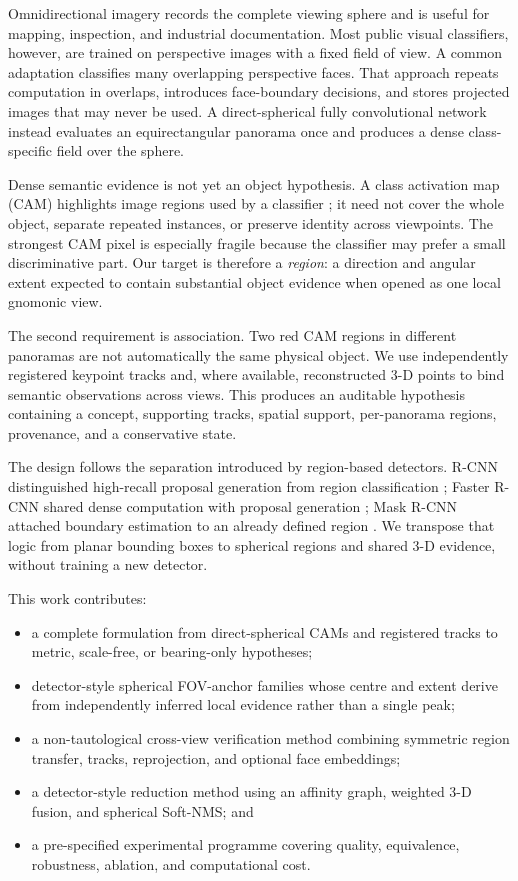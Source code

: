 \documentclass[a4paper,9pt]{extarticle}
\begin{document}
Omnidirectional imagery records the complete viewing sphere and is useful for mapping, inspection, and industrial documentation. Most public visual classifiers, however, are trained on perspective images with a fixed field of view. A common adaptation classifies many overlapping perspective faces. That approach repeats computation in overlaps, introduces face-boundary decisions, and stores projected images that may never be used. A direct-spherical fully convolutional network instead evaluates an equirectangular panorama once and produces a dense class-specific field over the sphere.

Dense semantic evidence is not yet an object hypothesis. A class activation map (CAM) highlights image regions used by a classifier \citep{zhou2016cam}; it need not cover the whole object, separate repeated instances, or preserve identity across viewpoints. The strongest CAM pixel is especially fragile because the classifier may prefer a small discriminative part. Our target is therefore a \emph{region}: a direction and angular extent expected to contain substantial object evidence when opened as one local gnomonic view.

The second requirement is association. Two red CAM regions in different panoramas are not automatically the same physical object. We use independently registered keypoint tracks and, where available, reconstructed 3-D points to bind semantic observations across views. This produces an auditable hypothesis containing a concept, supporting tracks, spatial support, per-panorama regions, provenance, and a conservative state.

The design follows the separation introduced by region-based detectors. R-CNN distinguished high-recall proposal generation from region classification \citep{girshick2014rcnn}; Faster R-CNN shared dense computation with proposal generation \citep{ren2015faster}; Mask R-CNN attached boundary estimation to an already defined region \citep{he2017mask}. We transpose that logic from planar bounding boxes to spherical regions and shared 3-D evidence, without training a new detector.

This work contributes:
\begin{itemize}
  \item a complete formulation from direct-spherical CAMs and registered tracks to metric, scale-free, or bearing-only hypotheses;
  \item detector-style spherical FOV-anchor families whose centre and extent derive from independently inferred local evidence rather than a single peak;
  \item a non-tautological cross-view verification method combining symmetric region transfer, tracks, reprojection, and optional face embeddings;
  \item a detector-style reduction method using an affinity graph, weighted 3-D fusion, and spherical Soft-NMS; and
  \item a pre-specified experimental programme covering quality, equivalence, robustness, ablation, and computational cost.
\end{itemize}
\end{document}
